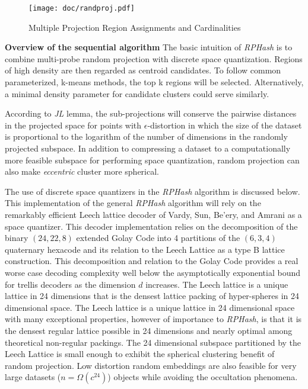 \documentclass[a4paper,10pt]{article}
\begin{document}
\begin{figure}%
\centering
\texttt{[image: doc/randproj.pdf]}
\caption{\label{randproj}Multiple Projection Region Assignments and
Cardinalities}
\end{figure}

\textbf{Overview of the sequential algorithm} The
basic intuition of \emph{RPHash} is to combine multi-probe random projection
with discrete space quantization.  Regions of high density are then regarded
as centroid candidates.  To follow common parameterized, k-means methods, the
top k regions will be selected.  Alternatively, a minimal density parameter
for candidate clusters could serve similarly.

 According to
\emph{JL} lemma, the sub-projections will conserve the pairwise distances
in the projected space for points with $\epsilon$-distortion in which
the size of the dataset is proportional to the logarithm of the number of
dimensions in the randomly projected subspace.	In addition to compressing
a dataset to a computationally more feasible subspace for performing space
quantization, random projection can also make \emph{eccentric} cluster more
spherical\cite{Dasgupta2000,vempala}.

The use of discrete space quantizers in the \emph{RPHash} algorithm is
discussed below.  This implementation of the general \emph{RPHash} algorithm
will rely on the remarkably efficient Leech lattice decoder of Vardy, Sun,
Be'ery, and Amrani\cite{Vardy95,Sun,Be'ery,Amrani} as a space quantizer.  This
decoder implementation relies on the decomposition of the binary $(24,22,8)$
extended Golay Code into 4 partitions of the $(6,3,4)$ quaternary hexacode
and its relation to the Leech Lattice as a type B lattice construction.
This decomposition and relation to the Golay Code provides a real worse
case decoding complexity well below the asymptotically exponential bound
for trellis decoders as the dimension $d$ increases\cite{Tarokh1,Tarokh2}.
The Leech lattice is a unique lattice in 24 dimensions that is the densest
lattice packing of hyper-spheres in 24 dimensional space\cite{leech,SPLAG}.
The Leech lattice is a unique lattice in 24 dimensional space with many
exceptional properties, however of importance to \emph{RPHash}, is that it
is the densest regular lattice possible in 24 dimensions and nearly optimal
among theoretical non-regular packings\cite{Cohn}.  The 24 dimensional
subspace partitioned by the Leech Lattice is small enough to exhibit the
spherical clustering benefit of random projection.  Low distortion random
embeddings are also feasible for very large datasets ($n = \Omega(c^{24})$)
objects while avoiding the occultation phenomena\cite{Urruty2007}.
\end{document}
